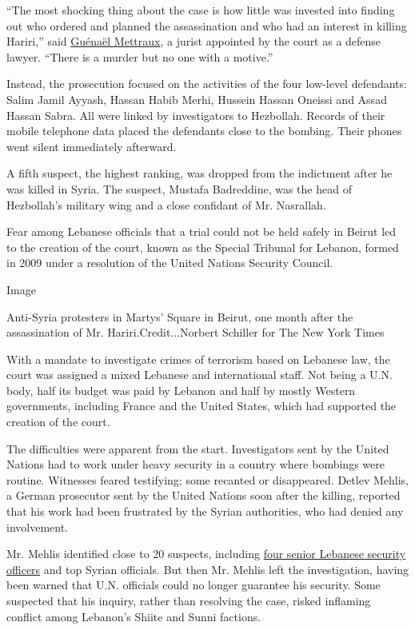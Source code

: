 ``The most shocking thing about the case is how little was invested into
finding out who ordered and planned the assassination and who had an
interest in killing Hariri,'' said
\href{https://www.doughtystreet.co.uk/barristers/dr-guenael-mettraux}{Guénaël
Mettraux}, a jurist appointed by the court as a defense lawyer. ``There
is a murder but no one with a motive.''

Instead, the prosecution focused on the activities of the four low-level
defendants: Salim Jamil Ayyash, Hassan Habib Merhi, Hussein Hassan
Oneissi and Assad Hassan Sabra. All were linked by investigators to
Hezbollah. Records of their mobile telephone data placed the defendants
close to the bombing. Their phones went silent immediately afterward.

A fifth suspect, the highest ranking, was dropped from the indictment
after he was killed in Syria. The suspect, Mustafa Badreddine, was the
head of Hezbollah's military wing and a close confidant of Mr.
Nasrallah.

Fear among Lebanese officials that a trial could not be held safely in
Beirut led to the creation of the court, known as the Special Tribunal
for Lebanon, formed in 2009 under a resolution of the United Nations
Security Council.

Image

Anti-Syria protesters in Martys' Square in Beirut, one month after the
assassination of Mr. Hariri.Credit...Norbert Schiller for The New York
Times

With a mandate to investigate crimes of terrorism based on Lebanese law,
the court was assigned a mixed Lebanese and international staff. Not
being a U.N. body, half its budget was paid by Lebanon and half by
mostly Western governments, including France and the United States,
which had supported the creation of the court.

The difficulties were apparent from the start. Investigators sent by the
United Nations had to work under heavy security in a country where
bombings were routine. Witnesses feared testifying; some recanted or
disappeared. Detlev Mehlis, a German prosecutor sent by the United
Nations soon after the killing, reported that his work had been
frustrated by the Syrian authorities, who had denied any involvement.

Mr. Mehlis identified close to 20 suspects, including
\href{https://www.nytimes.com/2005/09/02/world/4-highly-placed-lebanese-are-charged-in-killing-of-former-premier.html}{four
senior Lebanese security officers} and top Syrian officials. But then
Mr. Mehlis left the investigation, having been warned that U.N.
officials could no longer guarantee his security. Some suspected that
his inquiry, rather than resolving the case, risked inflaming conflict
among Lebanon's Shiite and Sunni factions.

